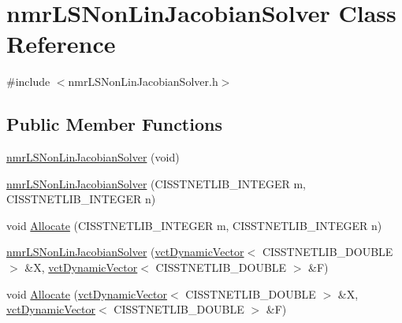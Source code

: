 \hypertarget{classnmr_l_s_non_lin_jacobian_solver}{\section{nmr\-L\-S\-Non\-Lin\-Jacobian\-Solver Class Reference}
\label{classnmr_l_s_non_lin_jacobian_solver}
}


{\ttfamily \#include $<$nmr\-L\-S\-Non\-Lin\-Jacobian\-Solver.\-h$>$}

\subsection*{Public Member Functions}
\begin{DoxyCompactItemize}
\item 
\hyperlink{classnmr_l_s_non_lin_jacobian_solver_a82d63a80d629c6aa4f047dac4724b84a}{nmr\-L\-S\-Non\-Lin\-Jacobian\-Solver} (void)
\item 
\hyperlink{classnmr_l_s_non_lin_jacobian_solver_aebdaf37647beda47284a1bf14dedae28}{nmr\-L\-S\-Non\-Lin\-Jacobian\-Solver} (C\-I\-S\-S\-T\-N\-E\-T\-L\-I\-B\-\_\-\-I\-N\-T\-E\-G\-E\-R m, C\-I\-S\-S\-T\-N\-E\-T\-L\-I\-B\-\_\-\-I\-N\-T\-E\-G\-E\-R n)
\item 
void \hyperlink{classnmr_l_s_non_lin_jacobian_solver_aef5dc0d192cb834af119367a560c0b9f}{Allocate} (C\-I\-S\-S\-T\-N\-E\-T\-L\-I\-B\-\_\-\-I\-N\-T\-E\-G\-E\-R m, C\-I\-S\-S\-T\-N\-E\-T\-L\-I\-B\-\_\-\-I\-N\-T\-E\-G\-E\-R n)
\end{DoxyCompactItemize}
{\bf }\par
\begin{DoxyCompactItemize}
\item 
\hyperlink{classnmr_l_s_non_lin_jacobian_solver_ace5ac8424a60357e1d9c2160cbaa87b2}{nmr\-L\-S\-Non\-Lin\-Jacobian\-Solver} (\hyperlink{classvct_dynamic_vector}{vct\-Dynamic\-Vector}$<$ C\-I\-S\-S\-T\-N\-E\-T\-L\-I\-B\-\_\-\-D\-O\-U\-B\-L\-E $>$ \&X, \hyperlink{classvct_dynamic_vector}{vct\-Dynamic\-Vector}$<$ C\-I\-S\-S\-T\-N\-E\-T\-L\-I\-B\-\_\-\-D\-O\-U\-B\-L\-E $>$ \&F)
\end{DoxyCompactItemize}

{\bf }\par
\begin{DoxyCompactItemize}
\item 
void \hyperlink{classnmr_l_s_non_lin_jacobian_solver_a7b282bdda91e1067e30a793b364346fc}{Allocate} (\hyperlink{classvct_dynamic_vector}{vct\-Dynamic\-Vector}$<$ C\-I\-S\-S\-T\-N\-E\-T\-L\-I\-B\-\_\-\-D\-O\-U\-B\-L\-E $>$ \&X, \hyperlink{classvct_dynamic_vector}{vct\-Dynamic\-Vector}$<$ C\-I\-S\-S\-T\-N\-E\-T\-L\-I\-B\-\_\-\-D\-O\-U\-B\-L\-E $>$ \&F)
\end{DoxyCompactItemize}

